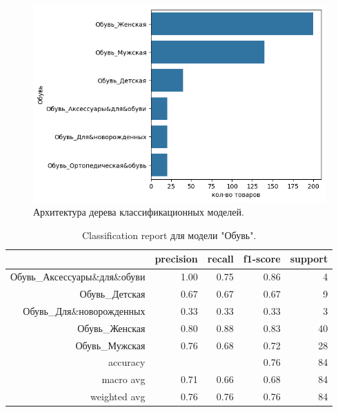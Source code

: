 \documentclass[a4paper,12pt]{extarticle}
\begin{document}
\begin{figure}[ht]
	\centering
	\includegraphics[scale=0.6]{приложения/amount_of_category_Обувь.png}
	\caption{Архитектура дерева классификационных моделей.}
	\label{fig:amount_of_category_Обувь2}
\end{figure}

\begin{table}[ht]
	\caption{Classification report для модели "Обувь".} 
	\label{table:classification_report_example}
	\footnotesize
	\centering
	\begin{tabular}{r|rrrr}
		\toprule
		{} & \multicolumn{1}{c}{precision} & \multicolumn{1}{c}{recall} & \multicolumn{1}{c}{f1-score} & \multicolumn{1}{c}{support}\\
		\midrule
		Обувь\_Аксессуары\&для\&обуви &	1.00 & 0.75 & 0.86 & 4\\
		Обувь\_Детская                & 0.67 & 0.67 & 0.67 & 9\\
		Обувь\_Для\&новорожденных     & 0.33 & 0.33 & 0.33 & 3\\
		Обувь\_Женская                &	0.80 & 0.88 & 0.83 & 40\\
		\bigskip
		Обувь\_Мужская                &	0.76 & 0.68 & 0.72 & 28\\
		accuracy                      &      &      & 0.76 & 84\\
		macro avg                     &	0.71 & 0.66 & 0.68 & 84\\
		weighted avg                  &	0.76 & 0.76 & 0.76 & 84\\
		\bottomrule
	\end{tabular}
\end{table}
\end{document}
